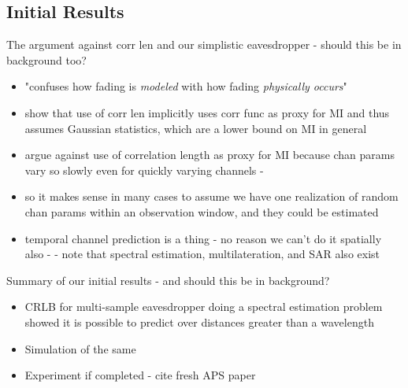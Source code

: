 \documentclass[12pt, titlepage]{article}
\begin{document}
\subsection*{Initial Results}
The argument against corr len and our simplistic eavesdropper - should this be in background too?
\begin{itemize}
\item "confuses how fading is \emph{modeled} with how fading \emph{physically occurs}"
\item show that use of corr len implicitly uses corr func as proxy for MI and thus assumes Gaussian statistics, which are a lower bound on MI in general\cite{cover2006-jgvars}
\item argue against use of correlation length as proxy for MI because chan params vary so slowly even for quickly varying channels - \cite{jakes1974, duel-hallen2007}
\item so it makes sense in many cases to assume we have one realization of random chan params within an observation window, and they could be estimated
\item temporal channel prediction is a thing - no reason we can't do it spatially also - \cite{eyceoz1999, andersen1999, duel-hallen2000, isukapalli2006} - note that spectral estimation, multilateration, and SAR also exist
\end{itemize}

Summary of our initial results - and should this be in background?
\begin{itemize}
\item CRLB for multi-sample eavesdropper doing a spectral estimation problem showed it is possible to predict over distances greater than a wavelength \cite{kckpVTC2015}
\item Simulation of the same \cite{brown2015}
\item Experiment if completed - cite fresh APS paper
\end{itemize}
\end{document}
